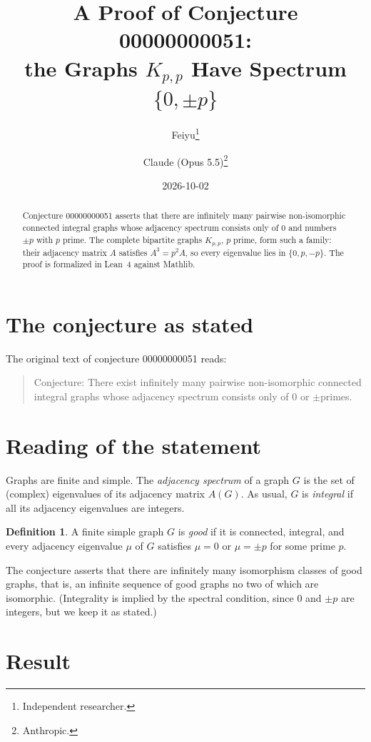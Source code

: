\documentclass[11pt]{article}
\title{A Proof of Conjecture 00000000051:\\
the Graphs $K_{p,p}$ Have Spectrum $\{0,\pm p\}$}
\author{%
  Feiyu\thanks{Independent researcher.}
  \and
  Claude (Opus 5.5)\thanks{Anthropic.}%
}
\date{2026-10-02}
\theoremstyle{plain}
\theoremstyle{definition}
\newtheorem{definition}[theorem]{Definition}
\theoremstyle{remark}
\begin{document}
\maketitle

\begin{abstract}
Conjecture 00000000051 asserts that there are infinitely many pairwise
non-isomorphic connected integral graphs whose adjacency spectrum consists only
of $0$ and numbers $\pm p$ with $p$ prime. The complete bipartite graphs
$K_{p,p}$, $p$ prime, form such a family: their adjacency matrix $A$ satisfies
$A^3=p^2A$, so every eigenvalue lies in $\{0,p,-p\}$. The proof is formalized
in Lean~4 against Mathlib.
\end{abstract}

\section{The conjecture as stated}

The original text of conjecture 00000000051 reads:

\begin{quote}
Conjecture: There exist infinitely many pairwise non-isomorphic connected
integral graphs whose adjacency spectrum consists only of $0$ or $\pm$primes.
\end{quote}

\section{Reading of the statement}

Graphs are finite and simple. The \emph{adjacency spectrum} of a graph $G$ is
the set of (complex) eigenvalues of its adjacency matrix $A(G)$. As usual, $G$
is \emph{integral} if all its adjacency eigenvalues are integers.

\begin{definition}
A finite simple graph $G$ is \emph{good} if it is connected, integral, and
every adjacency eigenvalue $\mu$ of $G$ satisfies $\mu=0$ or $\mu=\pm p$ for
some prime $p$.
\end{definition}

The conjecture asserts that there are infinitely many isomorphism classes of
good graphs, that is, an infinite sequence of good graphs no two of which are
isomorphic. (Integrality is implied by the spectral condition, since $0$ and
$\pm p$ are integers, but we keep it as stated.)

\section{Result}
\end{document}
